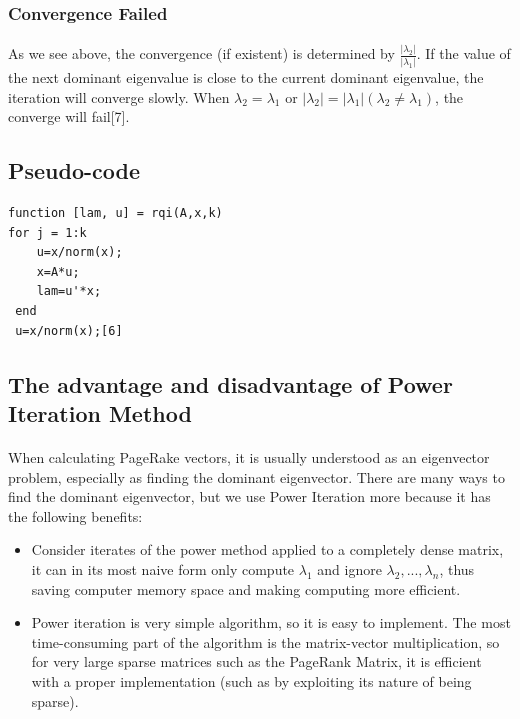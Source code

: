 \documentclass[12pt]{article}
\begin{document}
\subsubsection{Convergence Failed}
\paragraph{}As we see above, the convergence (if existent) is determined by $\frac{|\lambda_2|}{|\lambda_1|}$. If the value of the next dominant eigenvalue is close to the current dominant eigenvalue, the iteration will converge slowly. When $\lambda_2 = \lambda_1$ or $|\lambda_2| = |\lambda_1| (\lambda_2 \neq \lambda_1)$, the converge will fail[7].


\subsection{Pseudo-code}
\begin{verbatim}
function [lam, u] = rqi(A,x,k)
for j = 1:k
    u=x/norm(x);
    x=A*u;
    lam=u'*x;
 end
 u=x/norm(x);[6]
\end{verbatim}


\subsection{The advantage and disadvantage of Power Iteration Method}
\paragraph{} When calculating PageRake vectors, it is usually understood as an eigenvector problem, especially as finding the dominant eigenvector. There are many ways to find the dominant eigenvector, but we use Power Iteration more because it has the following benefits:
\begin{itemize}
    \item Consider iterates of the power method applied to a completely dense matrix, it can in its most naive form only compute $\lambda_1$ and ignore $\lambda_2,...,\lambda_n$, thus saving computer memory space and making computing more efficient.
    \item Power iteration is very simple algorithm, so it is easy to implement. The most time-consuming part of the algorithm is the matrix-vector multiplication, so for very large sparse matrices such as the PageRank Matrix, it is efficient with a proper implementation (such as by exploiting its nature of being sparse).
\end{itemize}
\end{document}
